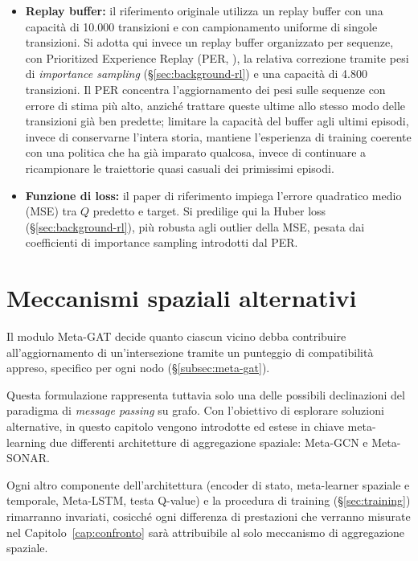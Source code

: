 \begin{itemize}
  \item \textbf{Replay buffer:} il riferimento originale utilizza un replay buffer con una capacità di 10.000 transizioni e con campionamento uniforme di singole transizioni. Si adotta qui invece un replay buffer organizzato per sequenze, con Prioritized Experience Replay (PER, \citealp{schaul2016per}), la relativa correzione tramite pesi di \emph{importance sampling} (§\ref{sec:background-rl}) e una capacità di 4.800 transizioni. Il PER concentra l'aggiornamento dei pesi sulle sequenze con errore di stima più alto, anziché trattare queste ultime allo stesso modo delle transizioni già ben predette; limitare la capacità del buffer agli ultimi episodi, invece di conservarne l'intera storia, mantiene l'esperienza di training coerente con una politica che ha già imparato qualcosa, invece di continuare a ricampionare le traiettorie quasi casuali dei primissimi episodi.

  \item \textbf{Funzione di loss:} il paper di riferimento impiega l'errore quadratico medio (MSE) tra $Q$ predetto e target. Si predilige qui la Huber loss (§\ref{sec:background-rl}), più robusta agli outlier della MSE, pesata dai coefficienti di importance sampling introdotti dal PER.
\end{itemize}


\section{Meccanismi spaziali alternativi}
\label{sec:spatial-alt}

Il modulo Meta-GAT decide quanto ciascun vicino debba contribuire
all'aggiornamento di un'intersezione tramite un punteggio di compatibilità
appreso, specifico per ogni nodo (§\ref{subsec:meta-gat}).

Questa formulazione rappresenta tuttavia solo una delle possibili declinazioni del paradigma di \emph{message passing} su grafo.
Con l'obiettivo di esplorare soluzioni alternative, in questo capitolo vengono introdotte ed estese in chiave meta-learning due differenti architetture di aggregazione spaziale: Meta-GCN e Meta-SONAR.

Ogni altro componente dell'architettura (encoder di stato, meta-learner
spaziale e temporale, Meta-LSTM, testa Q-value) e la procedura di training (§\ref{sec:training}) rimarranno invariati,
cosicché ogni differenza di prestazioni che verranno misurate nel Capitolo~\ref{cap:confronto} sarà attribuibile al solo
meccanismo di aggregazione spaziale.

